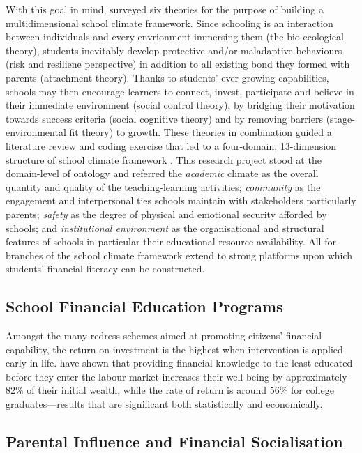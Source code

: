 \documentclass[a4paper,11pt,UKenglish,twoside,openright]{report}\usepackage[]{graphicx}\usepackage[]{color}
\begin{document}
With this goal in mind, \textcite{wang:2016} surveyed six theories for the purpose of building a multidimensional school climate framework. Since schooling is an interaction between individuals and every envrionment immersing them (the bio-ecological theory), students inevitably develop protective and/or maladaptive behaviours (risk and resiliene perspective) in addition to all existing bond they formed with parents (attachment theory). Thanks to students' ever growing capabilities, schools may then encourage learners to connect, invest, participate and believe in their immediate environment (social control theory), by bridging their motivation towards success criteria (social cognitive theory) and by removing barriers (stage-environmental fit theory) to growth. These theories in combination guided a literature review and coding exercise that led to a four-domain, 13-dimension structure of school climate framework \parencite[see Figure 1,][p. 318]{wang:2016}. This research project stood at the domain-level of  ontology and referred the \emph{academic} climate as the overall quantity and quality of the teaching-learning activities; \emph{community} as the engagement and interpersonal ties schools maintain with stakeholders particularly parents; \emph{safety} as the degree of physical and emotional security afforded by schools; and \emph{institutional environment} as the organisational and structural features of schools in particular their educational resource availability. All for branches of the school climate framework extend to strong platforms upon which students' financial literacy can be constructed.

\subsection{School Financial Education Programs}

Amongst the many redress schemes aimed at promoting citizens' financial capability, the return on investment is the highest when intervention is applied early in life. \textcite{lusardi:2014} have shown that providing financial knowledge to the least educated before they enter the labour market increases their well-being by approximately 82\% of their initial wealth, while the rate of return is around 56\% for college graduates---results that are significant both statistically and economically.

\subsection{Parental Influence and Financial Socialisation}
\end{document}
